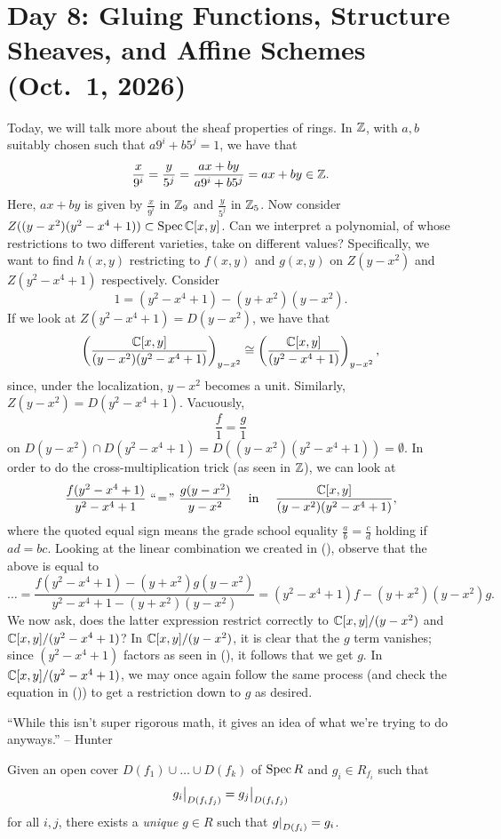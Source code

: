 \section{Day 8: Gluing Functions, Structure Sheaves, and Affine Schemes (Oct.\ 1, 2026)}
Today, we will talk more about the sheaf properties of rings. In $\mathbb Z$, with $a, b$ suitably chosen such that $a9^i + b5^j = 1$, we have that
\[ \frac{x}{9^i} = \frac{y}{5^j} = \frac{ax + by}{a9^i + b5^j} = ax + by \in \mathbb Z. \]
Here, $ax + by$ is given by $\frac{x}{9^i}$ in $\mathbb Z_9$ and $\frac{y}{5^j}$ in $\mathbb Z_5$. Now consider $Z((y - x^2)(y^2 - x^4 + 1)) \subset \operatorname{Spec} \mathbb C[x, y]$. Can we interpret a polynomial, of whose restrictions to two different varieties, take on different values? Specifically, we want to find $h(x, y)$ restricting to $f(x, y)$ and $g(x, y)$ on $Z(y - x^2)$ and $Z(y^2 - x^4 + 1)$ respectively. Consider
\[ 1 = (y^2 - x^4 + 1) - (y + x^2)(y - x^2). \tag{\textdagger} \]
If we look at $Z(y^2 - x^4 + 1) = D(y - x^2)$, we have that
\[ \left(\frac{\mathbb C[x, y]}{(y - x^2)(y^2 - x^4 + 1)}\right)_{y - x^2} \cong \left(\frac{\mathbb C[x, y]}{(y^2 - x^4 + 1)}\right)_{y - x^2}, \]
since, under the localization, $y - x^2$ becomes a unit. Similarly, $Z(y - x^2) = D(y^2 - x^4 + 1)$. Vacuously,
\[ \frac{f}{1} = \frac{g}{1} \]
on $D(y - x^2) \cap D(y^2 - x^4 + 1) = D((y - x^2)(y^2 - x^4 + 1)) = \emptyset$. In order to do the cross-multiplication trick (as seen in $\mathbb Z$), we can look at
\[ \frac{f(y^2 - x^4 +1)}{y^2 - x^4 + 1} \,\,``\!=\!"\,\, \frac{g(y - x^2)}{y - x^2} \quad \text{ in } \quad \frac{\mathbb C[x, y]}{(y - x^2)(y^2 - x^4 + 1)}, \]
where the quoted equal sign means the grade school equality $\frac{a}{b} = \frac{c}{d}$ holding if $ad = bc$. Looking at the linear combination we created in (\textdagger), observe that the above is equal to
\[ \dots = \frac{f(y^2 - x^4 + 1) - (y +x ^2) g (y - x^2)}{y^2 - x^4 + 1 - (y + x^2)(y - x^2)} = (y^2 - x^4 + 1) f - (y + x^2)(y - x^2) g. \]
We now ask, does the latter expression restrict correctly to $\mathbb C[x, y]/(y - x^2)$ and $\mathbb C[x, y]/(y^2 - x^4 + 1)$? In $\mathbb C[x, y]/(y - x^2)$, it is clear that the $g$ term vanishes; since $(y^2 - x^4 + 1)$ factors as seen in (\textdagger), it follows that we get $g$. In $\mathbb C[x, y]/(y^2 - x^4 + 1)$, we may once again follow the same process (and check the equation in (\textdagger)) to get a restriction down to $g$ as desired.

{\color{airforceblue} ``While this isn't super rigorous math, it gives an idea of what we're trying to do anyways.'' -- Hunter}

\begin{theorem} \label{thm:gluing_on_spectrum}
    Given an open cover $D(f_1) \cup \dots \cup D(f_k)$ of $\operatorname{Spec} R$ and $g_i \in R_{f_i}$ such that
    \[ \restr{g_i}{D(f_if_j)} = \restr{g_j}{D(f_if_j)} \]
    for all $i, j$, there exists a \textit{unique} $g \in R$ such that $\restr{g}{D(f_i)} = g_i$.
\end{theorem}

